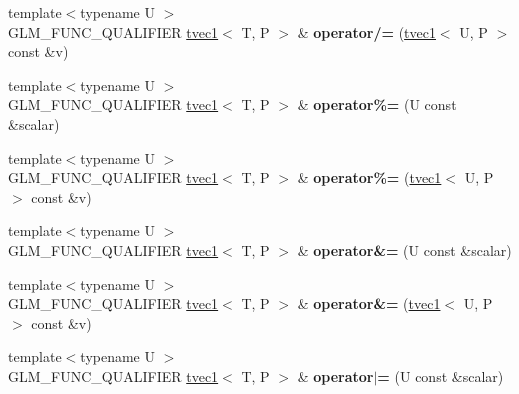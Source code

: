 \begin{DoxyCompactItemize}
\item 
\hypertarget{structglm_1_1tvec1_ad0331e0db142714cc1169da2d209eb01}{{\footnotesize template$<$typename U $>$ }\\G\-L\-M\-\_\-\-F\-U\-N\-C\-\_\-\-Q\-U\-A\-L\-I\-F\-I\-E\-R \hyperlink{structglm_1_1tvec1}{tvec1}$<$ T, P $>$ \& {\bfseries operator/=} (\hyperlink{structglm_1_1tvec1}{tvec1}$<$ U, P $>$ const \&v)}\label{structglm_1_1tvec1_ad0331e0db142714cc1169da2d209eb01}

\item 
\hypertarget{structglm_1_1tvec1_ad3c87207990e67175a224acdcaf6ed9e}{{\footnotesize template$<$typename U $>$ }\\G\-L\-M\-\_\-\-F\-U\-N\-C\-\_\-\-Q\-U\-A\-L\-I\-F\-I\-E\-R \hyperlink{structglm_1_1tvec1}{tvec1}$<$ T, P $>$ \& {\bfseries operator\%=} (U const \&scalar)}\label{structglm_1_1tvec1_ad3c87207990e67175a224acdcaf6ed9e}

\item 
\hypertarget{structglm_1_1tvec1_aa8eca5faec8c0bef17a99524d60bf89d}{{\footnotesize template$<$typename U $>$ }\\G\-L\-M\-\_\-\-F\-U\-N\-C\-\_\-\-Q\-U\-A\-L\-I\-F\-I\-E\-R \hyperlink{structglm_1_1tvec1}{tvec1}$<$ T, P $>$ \& {\bfseries operator\%=} (\hyperlink{structglm_1_1tvec1}{tvec1}$<$ U, P $>$ const \&v)}\label{structglm_1_1tvec1_aa8eca5faec8c0bef17a99524d60bf89d}

\item 
\hypertarget{structglm_1_1tvec1_ad77568c3ffa1c05c77cceb702d0c405b}{{\footnotesize template$<$typename U $>$ }\\G\-L\-M\-\_\-\-F\-U\-N\-C\-\_\-\-Q\-U\-A\-L\-I\-F\-I\-E\-R \hyperlink{structglm_1_1tvec1}{tvec1}$<$ T, P $>$ \& {\bfseries operator\&=} (U const \&scalar)}\label{structglm_1_1tvec1_ad77568c3ffa1c05c77cceb702d0c405b}

\item 
\hypertarget{structglm_1_1tvec1_abefaca20e1e35858d53e0d30763ed1a9}{{\footnotesize template$<$typename U $>$ }\\G\-L\-M\-\_\-\-F\-U\-N\-C\-\_\-\-Q\-U\-A\-L\-I\-F\-I\-E\-R \hyperlink{structglm_1_1tvec1}{tvec1}$<$ T, P $>$ \& {\bfseries operator\&=} (\hyperlink{structglm_1_1tvec1}{tvec1}$<$ U, P $>$ const \&v)}\label{structglm_1_1tvec1_abefaca20e1e35858d53e0d30763ed1a9}

\item 
\hypertarget{structglm_1_1tvec1_af8080243261c203cefdfc5b3a28e446f}{{\footnotesize template$<$typename U $>$ }\\G\-L\-M\-\_\-\-F\-U\-N\-C\-\_\-\-Q\-U\-A\-L\-I\-F\-I\-E\-R \hyperlink{structglm_1_1tvec1}{tvec1}$<$ T, P $>$ \& {\bfseries operator$\vert$=} (U const \&scalar)}\label{structglm_1_1tvec1_af8080243261c203cefdfc5b3a28e446f}


\end{DoxyCompactItemize}

